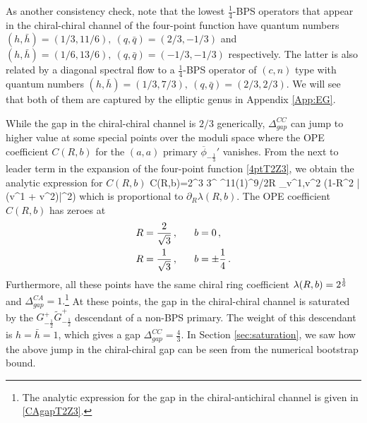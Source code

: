 \documentclass[12pt]{article}
\begin{document}
As another consistency check, note that the lowest $\frac14$-BPS operators that appear  in the chiral-chiral channel of the four-point function  have quantum numbers  $(h,\bar h)=(1/3,11/6),~  (q,\bar q)=(2/3,-1/3)$ and $(h,\bar h)=(1/6,13/6),~  (q,\bar q)=(-1/3, -1/3 )$ respectively. The latter is also related by a diagonal spectral flow to a $\frac14$-BPS operator of $(c,n)$ type with quantum numbers $(h,\bar h)=(1/3,7/3),~  (q,\bar q)=(2/3, 2/3 )$. We will see that both of them are captured by the elliptic genus in Appendix \ref{App:EG}.



While the gap in the chiral-chiral channel is $2/3$ generically, $\Delta^{CC}_{gap}$ can jump to higher value at some special points over the moduli space where the OPE coefficient  $C(R,b)$ for the $(a,a)$ primary $\overline\phi_{-\frac13}'$ vanishes. From the next to leader term in the expansion of the four-point function \eqref{4ptT2Z3}, we obtain the analytic expression for  $C(R,b)$
\ie
C(R,b)={2^3  3^{} \pi^{11}\over \Gamma\left({1}\right)^{9/2}}R \sum_{v^1,v^2\in {}} \exp{}
(1-\pi R^2  |(v^1 + \omega v^2)|^2)
\fe
which is proportional to $\partial_R \lambda(R,b)$.  The OPE coefficient $C(R,b)$ has zeroes at 
\begin{align}\label{zeroC}
\begin{split}
&R={2\over \sqrt{3} }\,,~~~~~b=0\,,\\
&R={1\over \sqrt{3}}\,,~~~~~b=\pm{1\over 4}\,.
\end{split}
\end{align}
Furthermore, all these points have the same chiral ring coefficient $\lambda(R,b) = 2^{1\over 6}$ and $\Delta^{CA}_{gap}=1.$\footnote{The analytic expression for the gap in the chiral-antichiral channel is given in \eqref{CAgapT2Z3}.}   
At these points, the gap in the chiral-chiral channel is saturated by the $G^+_{-\frac12}\tilde G^+_{-\frac12}$ descendant of a  non-BPS primary.  The weight of this descendant is $h=\bar h = 1$, which gives a gap $\Delta^{CC}_{gap} = \frac43$.    In Section \ref{sec:saturation}, we saw   how the above jump in the chiral-chiral gap can be seen from the numerical bootstrap bound. 



  
  
\end{document}
